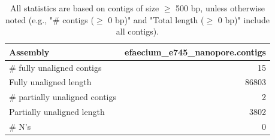 \documentclass[12pt,a4paper]{article}
\begin{document}
\begin{table}[ht]
\begin{center}
\caption{All statistics are based on contigs of size $\geq$ 500 bp, unless otherwise noted (e.g., "\# contigs ($\geq$ 0 bp)" and "Total length ($\geq$ 0 bp)" include all contigs).}
\begin{tabular}{|l*{1}{|r}|}
\hline
Assembly & efaecium\_e745\_nanopore.contigs \\ \hline
\# fully unaligned contigs & 15 \\ \hline
Fully unaligned length & 86803 \\ \hline
\# partially unaligned contigs & 2 \\ \hline
Partially unaligned length & 3802 \\ \hline
\# N's & 0 \\ \hline
\end{tabular}
\end{center}
\end{table}
\end{document}
